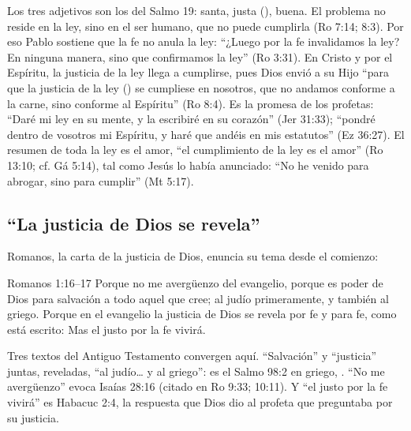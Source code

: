 Los tres adjetivos son los del Salmo 19: santa, justa (), buena. El problema no reside en la ley, sino en el ser humano, que no puede cumplirla (Ro 7:14; 8:3). Por eso Pablo sostiene que la fe no anula la ley: ``¿Luego por la fe invalidamos la ley? En ninguna manera, sino que confirmamos la ley'' (Ro 3:31). En Cristo y por el Espíritu, la justicia de la ley llega a cumplirse, pues Dios envió a su Hijo ``para que la justicia de la ley () se cumpliese en nosotros, que no andamos conforme a la carne, sino conforme al Espíritu'' (Ro 8:4). Es la promesa de los profetas: ``Daré mi ley en su mente, y la escribiré en su corazón'' (Jer 31:33); ``pondré dentro de vosotros mi Espíritu, y haré que andéis en mis estatutos'' (Ez 36:27). El resumen de toda la ley es el amor, ``el cumplimiento de la ley es el amor'' (Ro 13:10; cf. Gá 5:14), tal como Jesús lo había anunciado: ``No he venido para abrogar, sino para cumplir'' (Mt 5:17).

\subsection{“La justicia de Dios se revela”}
Romanos, la carta de la justicia de Dios, enuncia su tema desde el comienzo:

\begin{verso}{Romanos 1:16–17}
Porque no me avergüenzo del evangelio, porque es poder de Dios para salvación a todo aquel que cree; al judío primeramente, y también al griego. Porque en el evangelio la justicia de Dios se revela por fe y para fe, como está escrito: Mas el justo por la fe vivirá.
\end{verso}

Tres textos del Antiguo Testamento convergen aquí. ``Salvación'' y ``justicia'' juntas, reveladas, ``al judío\ldots{} y al griego'': es el Salmo 98:2 en griego, . ``No me avergüenzo'' evoca Isaías 28:16 (citado en Ro 9:33; 10:11). Y ``el justo por la fe vivirá'' es Habacuc 2:4, la respuesta que Dios dio al profeta que preguntaba por su justicia.

